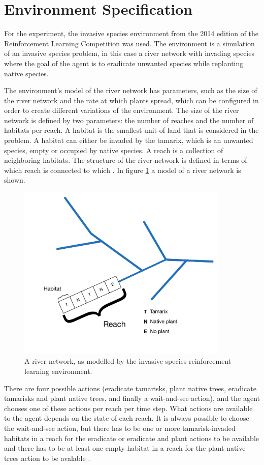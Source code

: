 \section{Environment Specification }
\label{sec:experiment_env}

For the experiment, the invasive species environment from the 2014 edition of
the Reinforcement Learning Competition was used. The environment is a
simulation of an invasive species problem, in this case a river network with
invading species where the goal of the agent is to eradicate unwanted species
while replanting native species. 

The environment's model of the river network has parameters, such as the size
of the river network and the rate at which plants spread, which can be
configured in order to create different variations of the environment.  The
size of the river network is defined by two parameters: the number of reaches
and the number of habitats per reach. A habitat is the smallest unit of land
that is considered in the problem. A habitat can either be invaded by the
tamarix, which is an unwanted species, empty or occupied by native species. A
reach is a collection of neighboring habitats. The structure of the river
network is defined in terms of which reach is connected to which
\parencite{invasiveSpecis2014:Online}. In figure \ref{fig:river} a model of a
river network is shown.

\begin{figure}[ht]
\centering
\includegraphics[width=0.9\textwidth]{images/river_network.pdf}
\caption{A river network, as modelled by the invasive species reinforcement learning environment.}
\label{fig:river}
\end{figure}

There are four possible actions (eradicate tamarisks, plant native trees,
eradicate tamarisks and plant native trees, and finally a wait-and-see action),
and the agent chooses one of these actions per reach per time step. What
actions are available to the agent depends on the state of each reach. It is
always possible to choose the wait-and-see action, but there has to be one
or more tamarisk-invaded habitats in a reach for the eradicate or eradicate and
plant actions to be available and there has to be at least one empty habitat in
a reach for the plant-native-trees action to be avalable
\parencite{invasiveSpecis2014:Online}. 

